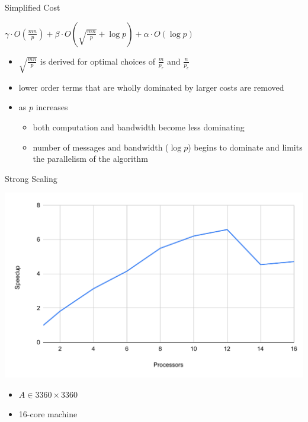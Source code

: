 \documentclass[xcolor=dvipsnames]{beamer}
\begin{document}
\begin{frame}{Simplified Cost}
\begin{center}
$
\gamma \cdot O\left(\frac{mn}{p}\right) + \beta \cdot O\left(\sqrt{\frac{mn}{p}} + \log{p}\right) + \alpha \cdot O\left(\log{p}\right)
$
\end{center}
\begin{itemize}
\item $\sqrt{\frac{mn}{p}}$ is derived for optimal choices of $\frac{m}{p_r}$ and $\frac{n}{p_c}$
\item lower order terms that are wholly dominated by larger costs are removed
\item as $p$ increases
\begin{itemize}
\item both computation and bandwidth become less dominating
\item number of messages and bandwidth ($\log{p}$) begins to dominate and limits the parallelism of the algorithm

\end{itemize}
\end{itemize}
\end{frame}

\begin{frame}{Strong Scaling}
\begin{center}
\includegraphics[scale=0.5]{strong}
\end{center}
\begin{itemize}
\item $A \in 3360\times3360$
\item 16-core machine
\end{itemize}
\end{frame}
\end{document}
